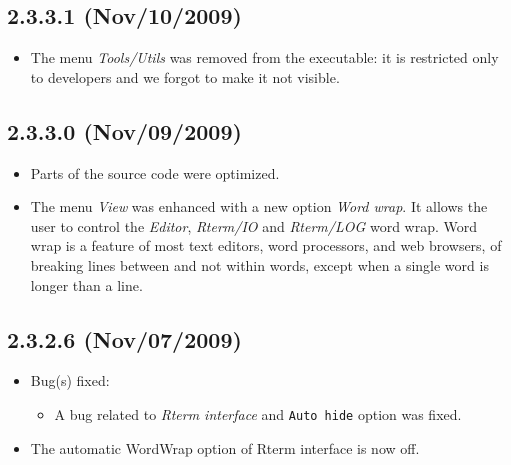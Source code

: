 \subsection*{2.3.3.1 (Nov/10/2009)}
\begin{itemize}
  \item The menu \textit{Tools/Utils} was removed from the executable:
    it is restricted only to developers and we forgot to make it not
    visible.
\end{itemize}


\subsection*{2.3.3.0 (Nov/09/2009)}
\begin{itemize}
  \item Parts of the source code were optimized.
  \item The menu \textit{View} was enhanced with a new option \textit{Word wrap}.
    It allows the user to control the \textit{Editor}, \textit{Rterm/IO} and
    \textit{Rterm/LOG} word wrap. Word wrap is a feature of most text editors,
    word processors, and web browsers, of breaking lines between and not within
    words, except when a single word is longer than a line.
\end{itemize}


\subsection*{2.3.2.6 (Nov/07/2009)}
\begin{itemize}
  \item Bug(s) fixed:
    \begin{itemize}
      \item A bug related to \textit{Rterm interface} and \texttt{Auto hide} option
        was fixed.
    \end{itemize}
  \item The automatic WordWrap option of Rterm interface is now off.
\end{itemize}


